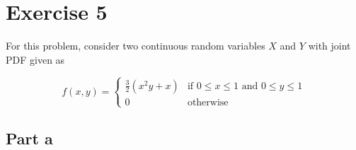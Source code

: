 \section{Exercise 5}
For this problem, consider two continuous random variables $X$ and $Y$ with joint PDF given as

\[
	f(x,y) = \begin{cases}
		\frac{3}{2}(x^2y +x) & \text{if } 0 \leq x \leq 1 \text{ and } 0 \leq y \leq 1 \\
		0                    & \text{otherwise}
	\end{cases}
\]

\subsection{Part a}

